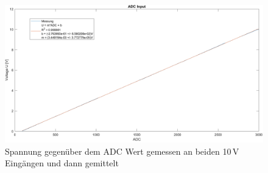 \begin{figure}[h!]
	\centering
	\includegraphics[width=1\textwidth]{graphics/ADC_Input_Kurve.png}
	\caption{Spannung gegenüber dem ADC Wert gemessen an beiden 10\,V Eingängen und dann gemittelt}
	\label{pic: /ADC_Input_Kurve}
\end{figure}

